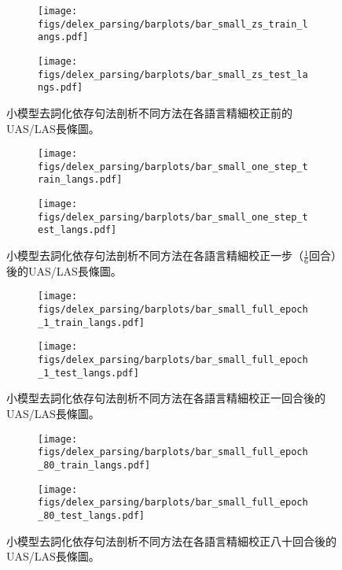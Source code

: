 \begin{figure}[htbp]
    \centering
    \begin{subfigure}[t]{0.8\textwidth}
        \centering
        \texttt{[image: figs/delex\_parsing/barplots/bar\_small\_zs\_train\_langs.pdf]}
    \end{subfigure}
    \vspace{-12pt}
    \begin{subfigure}[t]{0.8\textwidth}
        \centering
        \texttt{[image: figs/delex\_parsing/barplots/bar\_small\_zs\_test\_langs.pdf]}
    \end{subfigure}
    \caption{小模型去詞化依存句法剖析不同方法在各語言精細校正前的UAS/LAS長條圖。}
    \label{fig:bar_small_zs}
\end{figure}
\begin{figure}[htbp]
    \centering
    \begin{subfigure}[t]{0.8\textwidth}
        \centering
        \texttt{[image: figs/delex\_parsing/barplots/bar\_small\_one\_step\_train\_langs.pdf]}
    \end{subfigure}
    \vspace{-12pt}
    \begin{subfigure}[t]{0.8\textwidth}
        \centering
        \texttt{[image: figs/delex\_parsing/barplots/bar\_small\_one\_step\_test\_langs.pdf]}
    \end{subfigure}
    \caption{小模型去詞化依存句法剖析不同方法在各語言精細校正一步（$\frac{1}{6}$回合）後的UAS/LAS長條圖。}
    \label{fig:bar_small_one_step}
\end{figure}
\begin{figure}[htbp]
    \centering
    \begin{subfigure}[t]{0.8\textwidth}
        \centering
        \texttt{[image: figs/delex\_parsing/barplots/bar\_small\_full\_epoch\_1\_train\_langs.pdf]}
    \end{subfigure}
    \vspace{-12pt}
    \begin{subfigure}[t]{0.8\textwidth}
        \centering
        \texttt{[image: figs/delex\_parsing/barplots/bar\_small\_full\_epoch\_1\_test\_langs.pdf]}
    \end{subfigure}
    \caption{小模型去詞化依存句法剖析不同方法在各語言精細校正一回合後的UAS/LAS長條圖。}
    \label{fig:bar_small_full_epoch_1}
\end{figure}
\begin{figure}[htbp]
    \centering
    \begin{subfigure}[t]{0.8\textwidth}
        \centering
        \texttt{[image: figs/delex\_parsing/barplots/bar\_small\_full\_epoch\_80\_train\_langs.pdf]}
    \end{subfigure}
    \vspace{-12pt}
    \begin{subfigure}[t]{0.8\textwidth}
        \centering
        \texttt{[image: figs/delex\_parsing/barplots/bar\_small\_full\_epoch\_80\_test\_langs.pdf]}
    \end{subfigure}
    \caption{小模型去詞化依存句法剖析不同方法在各語言精細校正八十回合後的UAS/LAS長條圖。}
    \label{fig:bar_small_full_epoch_80}
\end{figure}
